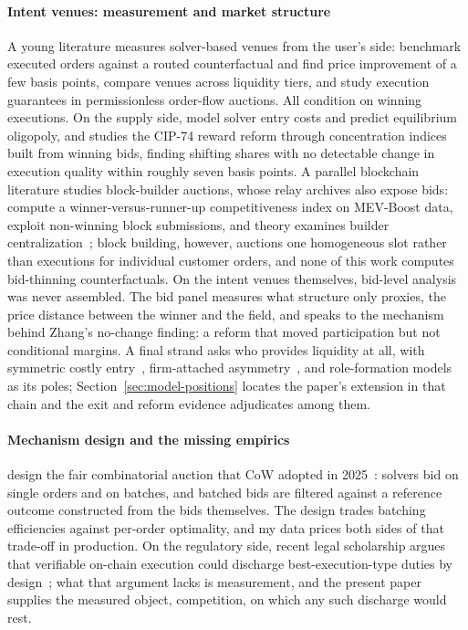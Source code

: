 \documentclass[11pt]{article}
\theoremstyle{plain}
\theoremstyle{definition}
\theoremstyle{remark}
\begin{document}
\paragraph{Intent venues: measurement and market structure} A young literature measures solver-based venues from the user's side: \citet{bachu2024quantifying} benchmark executed orders against a routed counterfactual and find price improvement of a few basis points, \citet{yuminaga2025welfare} compare venues across liquidity tiers, and \citet{watts2025failure} study execution guarantees in permissionless order-flow auctions. All condition on winning executions. On the supply side, \citet{chitra2024intent} model solver entry costs and predict equilibrium oligopoly, and \citet{zhang2026incentives} studies the CIP-74 reward reform through concentration indices built from winning bids, finding shifting shares with no detectable change in execution quality within roughly seven basis points. A parallel blockchain literature studies block-builder auctions, whose relay archives also expose bids: \citet{yang2024builder} compute a winner-versus-runner-up competitiveness index on MEV-Boost data, \citet{pahari2025exclusive} exploit non-winning block submissions, and theory examines builder centralization~\citep{bahrani2024pbs,gupta2023centralizing}; block building, however, auctions one homogeneous slot rather than executions for individual customer orders, and none of this work computes bid-thinning counterfactuals. On the intent venues themselves, bid-level analysis was never assembled. The bid panel measures what structure only proxies, the price distance between the winner and the field, and speaks to the mechanism behind Zhang's no-change finding: a reform that moved participation but not conditional margins. A final strand asks who provides liquidity at all, with symmetric costly entry~\citep{mcafee1987entry,levin1994entry}, firm-attached asymmetry~\citep{maskin2000asymmetric}, and role-formation models~\citep{atkeson2015entry,farboodi2023emergence,sambalaibat2025clienteles} as its poles; Section~\ref{sec:model-positions} locates the paper's extension in that chain and the exit and reform evidence adjudicates among them.

\paragraph{Mechanism design and the missing empirics} \citet{canidio2024fair} design the fair combinatorial auction that CoW adopted in 2025~\citep{cowdao_fairauction}: solvers bid on single orders and on batches, and batched bids are filtered against a reference outcome constructed from the bids themselves. The design trades batching efficiencies against per-order optimality, and my data prices both sides of that trade-off in production. On the regulatory side, recent legal scholarship argues that verifiable on-chain execution could discharge best-execution-type duties by design~\citep{le2026fairness}; what that argument lacks is measurement, and the present paper supplies the measured object, competition, on which any such discharge would rest.
\end{document}
